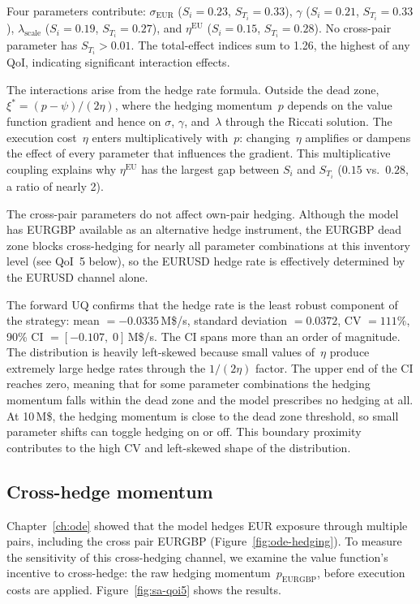 Four parameters contribute: $\sigma_{\text{EUR}}$ ($S_i = 0.23$, $S_{T_i} = 0.33$), $\gamma$ ($S_i = 0.21$, $S_{T_i} = 0.33$), $\lambda_{\text{scale}}$ ($S_i = 0.19$, $S_{T_i} = 0.27$), and $\eta^{\text{EU}}$ ($S_i = 0.15$, $S_{T_i} = 0.28$). No cross-pair parameter has $S_{T_i} > 0.01$. The total-effect indices sum to 1.26, the highest of any QoI, indicating significant interaction effects.

The interactions arise from the hedge rate formula. Outside the dead zone, $\xi^* = (p - \psi)/(2\eta)$, where the hedging momentum~$p$ depends on the value function gradient and hence on $\sigma$, $\gamma$, and~$\lambda$ through the Riccati solution. The execution cost~$\eta$ enters multiplicatively with~$p$: changing~$\eta$ amplifies or dampens the effect of every parameter that influences the gradient. This multiplicative coupling explains why $\eta^{\text{EU}}$ has the largest gap between $S_i$ and $S_{T_i}$ ($0.15$ vs.\ $0.28$, a ratio of nearly 2).

The cross-pair parameters do not affect own-pair hedging. Although the model has EURGBP available as an alternative hedge instrument, the EURGBP dead zone blocks cross-hedging for nearly all parameter combinations at this inventory level (see QoI~5 below), so the EURUSD hedge rate is effectively determined by the EURUSD channel alone.

The forward UQ confirms that the hedge rate is the least robust component of the strategy: mean $= -0.0335$\,M\$/s, standard deviation $= 0.0372$, CV $= 111\%$, 90\% CI $= [-0.107,\; 0]$\,M\$/s. The CI spans more than an order of magnitude. The distribution is heavily left-skewed because small values of~$\eta$ produce extremely large hedge rates through the $1/(2\eta)$ factor. The upper end of the CI reaches zero, meaning that for some parameter combinations the hedging momentum falls within the dead zone and the model prescribes no hedging at all. At 10\,M\$, the hedging momentum is close to the dead zone threshold, so small parameter shifts can toggle hedging on or off. This boundary proximity contributes to the high CV and left-skewed shape of the distribution.


\subsection{Cross-hedge momentum}
\label{sec:sa-qoi5}

Chapter~\ref{ch:ode} showed that the model hedges EUR exposure through multiple pairs, including the cross pair EURGBP (Figure~\ref{fig:ode-hedging}). To measure the sensitivity of this cross-hedging channel, we examine the value function's incentive to cross-hedge: the raw hedging momentum~$p_{\text{EURGBP}}$, before execution costs are applied. Figure~\ref{fig:sa-qoi5} shows the results.

